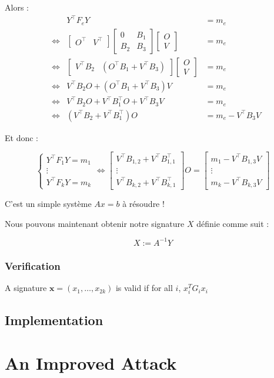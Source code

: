 \documentclass[12pt, a4paper]{article}
\begin{document}
	Alors :
	\begin{align*}
		&&Y^\top F_e Y &= m_e \\
		&\Leftrightarrow &\begin{bmatrix} O^\top & V^\top \end{bmatrix} \begin{bmatrix}
			0 & B_1 \\
			B_2 & B_3
		\end{bmatrix} \begin{bmatrix} O \\ V \end{bmatrix} &= m_e \\
		&\Leftrightarrow &\begin{bmatrix} V^\top B_2 & (O^\top B_1 + V^\top B_3) \end{bmatrix} \begin{bmatrix} O \\ V \end{bmatrix} &= m_e \\
		&\Leftrightarrow &V^\top B_2 O + (O^\top B_1 + V^\top B_3) V &= m_e \\
		&\Leftrightarrow &V^\top B_2 O + V^\top B_1^\top O + V^\top B_3V &= m_e \\
		&\Leftrightarrow &(V^\top B_2 + V^\top B_1^\top) O &= m_e - V^\top B_3 V
	\end{align*}
	
	Et donc :
	
	$$
	\begin{cases}
		Y^\top F_1 Y = m_1 \\
		\vdots \\
		Y^\top F_k Y = m_k
	\end{cases}
	\Leftrightarrow\begin{bmatrix}
		V^\top B_{1, 2} + V^\top B_{1, 1}^\top \\
		\vdots \\
		V^\top B_{k, 2} + V^\top B_{k, 1}^\top
	\end{bmatrix}
	O = \begin{bmatrix}
		m_1 - V^\top B_{1, 3}V\\
		\vdots \\
		m_k - V^\top B_{k, 3}V
	\end{bmatrix}
	$$
	
	C'est un simple système $Ax = b$ à résoudre !
	
	Nous pouvons maintenant obtenir notre signature $X$ définie comme suit :
	
	$$X := A^{-1}Y$$
	
	\subsubsection{Verification}
	
	A signature $\mathbf{x} = (x_1,\dots,x_{2k})$ is valid if for all $i$, $x_i^TG_ix_i$
	
	\subsection{Implementation}
	
	
	
	\section{An Improved Attack}
	
	\subsection{}
		
\end{document}
